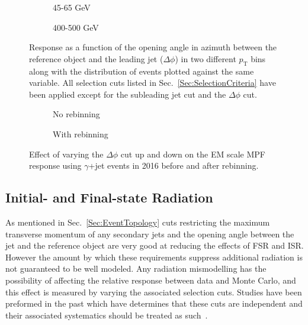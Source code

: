 \begin{figure}[!ht]
\centering
\begin{subfigure}{.5\textwidth}
\centering
{}
\caption{45-65 GeV}
\end{subfigure}%
\begin{subfigure}{.5\textwidth}
\centering
{}
\caption{400-500 GeV}
\end{subfigure}
\caption[Response as a function of $\Delta\phi$ for two $p_{\mathrm{T}}$ bins]
{\small Response as a function of the opening angle in azimuth between the reference object and the leading jet ($\Delta\phi$) in two different $p_{\mathrm T}$ bins along with the distribution of events plotted against the same variable.  All selection cuts listed in Sec.~\ref{Sec:SelectionCriteria} have been applied except for the subleading jet cut and the $\Delta\phi$ cut.  }
\label{Fig:RespVsdPhiGJetEM2016}
\end{figure}

\begin{figure}[!ht]
\centering
\begin{subfigure}{.5\textwidth}
\centering
{}
\caption{No rebinning}
\end{subfigure}%
\begin{subfigure}{.5\textwidth}  \centering
{}
\caption{With rebinning}
\end{subfigure}
\caption{Effect of varying the $\Delta\phi$ cut up and down on the EM scale MPF response using $\gamma$+jet events in 2016 before and after rebinning. }
\label{Fig:dPhiGJetEM2016}
\end{figure}

\subsection{Initial- and Final-state Radiation}
As mentioned in Sec.~\ref{Sec:EventTopology} cuts restricting the maximum transverse momentum of any secondary jets and the opening angle between the jet and the reference object are very good at reducing the effects of FSR and ISR.
However the amount by which these requirements suppress additional radiation is not guaranteed to be well modeled.
Any radiation mismodelling has the possibility of affecting the relative response between data and Monte Carlo, and this effect is measured by varying the associated selection cuts.  
Studies have been preformed in the past which have determines that these cuts are independent and their associated systematics should be treated as such~\cite{ATLAS-CONF-2011-031}.  

